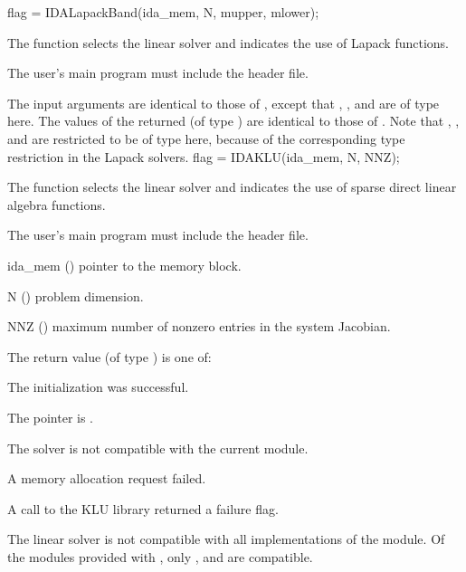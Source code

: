 {
  flag = IDALapackBand(ida\_mem, N, mupper, mlower);
}
{
  The function  selects the {\idaband} linear solver and
  indicates the use of Lapack functions. 

  The user's main program must include the  header file.
}
{
  The input arguments are identical to those of , except
  that , , and  are of type  here.
}
{
  The values of the returned  (of type ) are identical
  to those of .
}
{
  Note that , , and  are restricted to be of type 
  here, because of the corresponding type restriction in the Lapack solvers.
}
{
  flag = IDAKLU(ida\_mem, N, NNZ);
}
{
  The function  selects the {\idaklu} linear solver and indicates
  the use of sparse direct linear algebra functions.

  The user's main program must include the  header file.
}
{
  \begin{args}
  \item[ida\_mem] ()
    pointer to the {\ida} memory block.
  \item[N] ()
    problem dimension.
  \item[NNZ] ()
    maximum number of nonzero entries in the system Jacobian.
  \end{args}
}
{
  The return value  (of type ) is one of:
  \begin{args}
  \item[\Id{IDASLS\_SUCCESS}] 
    The {\idaklu} initialization was successful.
  \item[\Id{IDASLS\_MEM\_NULL}]
    The  pointer is .
  \item[\Id{IDASLS\_ILL\_INPUT}]
    The {\idaklu} solver is not compatible with the current {\nvector} module.
  \item[\Id{IDASLS\_MEM\_FAIL}]
    A memory allocation request failed.
  \item[\Id{IDASLS\_PACKAGE\_FAIL}]
    A call to the KLU library returned a failure flag.
  \end{args}
}
{
  The {\idaklu} linear solver is not compatible with all
  implementations of the {\nvector} module. 
  Of the {\nvector} modules provided with {\sundials}, only {\nvecs},
  {\nvecopenmp} and {\nvecpthreads} are compatible.
}
